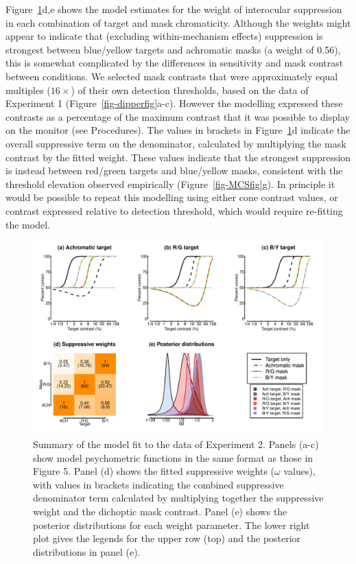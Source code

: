 \documentclass[
  letterpaper,
  DIV=11,
  numbers=noendperiod]{scrartcl}
\begin{document}
Figure~\ref{fig-MCSmodel}d,e shows the model estimates for the weight of
interocular suppression in each combination of target and mask
chromaticity. Although the weights might appear to indicate that
(excluding within-mechanism effects) suppression is strongest between
blue/yellow targets and achromatic masks (a weight of 0.56), this is
somewhat complicated by the differences in sensitivity and mask contrast
between conditions. We selected mask contrasts that were approximately
equal multiples (\(16\times\)) of their own detection thresholds, based
on the data of Experiment 1 (Figure~\ref{fig-dipperfig}a-c). However the
modelling expressed these contrasts as a percentage of the maximum
contrast that it was possible to display on the monitor (see
Procedures). The values in brackets in Figure~\ref{fig-MCSmodel}d
indicate the overall suppressive term on the denominator, calculated by
multiplying the mask contrast by the fitted weight. These values
indicate that the strongest suppression is instead between red/green
targets and blue/yellow masks, consistent with the threshold elevation
observed empirically (Figure~\ref{fig-MCSfig}g). In principle it would
be possible to repeat this modelling using either cone contrast values,
or contrast expressed relative to detection threshold, which would
require re-fitting the model.

\begin{figure}

{\centering \includegraphics{Figures/MCSmodel.pdf}

}

\caption{\label{fig-MCSmodel}Summary of the model fit to the data of
Experiment 2. Panels (a-c) show model psychometric functions in the same
format as those in Figure 5. Panel (d) shows the fitted suppressive
weights (\(\omega\) values), with values in brackets indicating the
combined suppressive denominator term calculated by multiplying together
the suppressive weight and the dichoptic mask contrast. Panel (e) shows
the posterior distributions for each weight parameter. The lower right
plot gives the legends for the upper row (top) and the posterior
distributions in panel (e).}

\end{figure}
\end{document}
